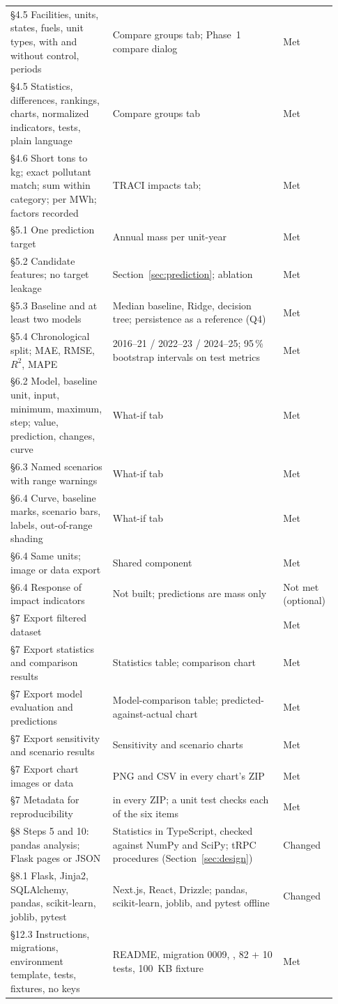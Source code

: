 \documentclass[11pt,a4paper]{article}
\begin{document}
{\begin{longtable}{@{}R{0.3\linewidth}R{0.5\linewidth}R{0.13\linewidth}@{}}
\S4.5 Facilities, units, states, fuels, unit types, with and without control, periods & Compare groups tab; Phase~1 compare dialog & Met\\
\S4.5 Statistics, differences, rankings, charts, normalized indicators, tests, plain language & Compare groups tab & Met\\
\S4.6 Short tons to kg; exact pollutant match; sum within category; per MWh; factors recorded & TRACI impacts tab;  & Met\\
\S5.1 One prediction target & Annual \NOx{} mass per unit-year & Met\\
\S5.2 Candidate features; no target leakage & Section~\ref{sec:prediction}; ablation & Met\\
\S5.3 Baseline and at least two models & Median baseline, Ridge, decision tree; persistence as a reference (Q4) & Met\\
\S5.4 Chronological split; MAE, RMSE, $R^2$, MAPE & 2016--21 / 2022--23 / 2024--25; 95\,\% bootstrap intervals on test metrics & Met\\
\S6.2 Model, baseline unit, input, minimum, maximum, step; value, prediction, changes, curve & What-if tab & Met\\
\S6.3 Named scenarios with range warnings & What-if tab & Met\\
\S6.4 Curve, baseline marks, scenario bars, labels, out-of-range shading & What-if tab & Met\\
\S6.4 Same units; image or data export & Shared  component & Met\\
\S6.4 Response of impact indicators & Not built; predictions are \NOx{} mass only & Not met (optional)\\
\S7 Export filtered dataset &  & Met\\
\S7 Export statistics and comparison results & Statistics table; comparison chart & Met\\
\S7 Export model evaluation and predictions & Model-comparison table; predicted-against-actual chart & Met\\
\S7 Export sensitivity and scenario results & Sensitivity and scenario charts & Met\\
\S7 Export chart images or data & PNG and CSV in every chart's ZIP & Met\\
\S7 Metadata for reproducibility &  in every ZIP; a unit test checks each of the six items & Met\\
\S8 Steps 5 and 10: pandas analysis; Flask pages or JSON & Statistics in TypeScript, checked against NumPy and SciPy; tRPC procedures (Section~\ref{sec:design}) & Changed\\
\S8.1 Flask, Jinja2, SQLAlchemy, pandas, scikit-learn, joblib, pytest & Next.js, React, Drizzle; pandas, scikit-learn, joblib, and pytest offline & Changed\\
\S12.3 Instructions, migrations, environment template, tests, fixtures, no keys & README, migration 0009, , 82 + 10 tests, 100~KB fixture & Met\\
\bottomrule
\end{longtable}}
\end{document}
